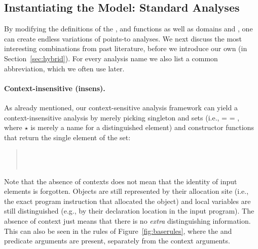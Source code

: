 \begin{itemize}


\end{itemize}


\subsection{Instantiating the Model: Standard Analyses}
\label{sec:instances}

By modifying the definitions of the ,
 and  functions as well as
domains  and , one can create endless variations of
points-to analyses. We next discuss the most interesting combinations
from past literature, before we introduce our own (in
Section~\ref{sec:hybrid}).  For every analysis name we also list a
common abbreviation, which we often use later.

\paragraph{Context-insensitive (insens).}
As already mentioned, our context-sensitive analysis framework can
yield a context-insensitive analysis by merely picking singleton
 and  sets (i.e.,  =  =
\args{\{$\star$\}}, where $\star$ is merely a name for a distinguished
element) and constructor functions that return the single element of
the set:
\begin{quote}
\\
 \\
\end{quote}

\noindent Note that the absence of contexts does not mean that the
identity of input elements is forgotten. Objects are still represented
by their allocation site (i.e., the exact program instruction that
allocated the object) and local variables are still distinguished
(e.g., by their declaration location in the input program). The
absence of context just means that there is no \emph{extra}
distinguishing information. This can also be seen in the rules of
Figure~\ref{fig:baserules}, where the  and 
predicate arguments are present, separately from the context
arguments.

